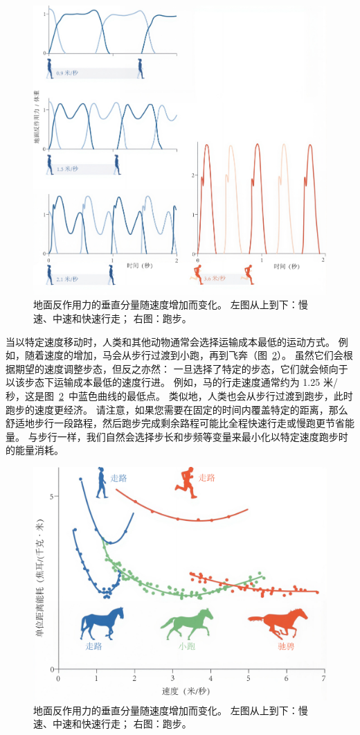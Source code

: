\begin{figure}[!htb]
	\centering
	\includegraphics[width=1.0\linewidth]{chap3/3_17}
	\caption{地面反作用力的垂直分量随速度增加而变化。
		左图从上到下：慢速、中速和快速行走；
		右图：跑步\cite{alexander1984walking}。 \label{fig:3_17}}
\end{figure}


当以特定速度移动时，人类和其他动物通常会选择运输成本最低的运动方式。
例如，随着速度的增加，马会从步行过渡到小跑，再到飞奔（图~\ref{fig:3_18}）。
虽然它们会根据期望的速度调整步态，但反之亦然：
一旦选择了特定的步态，它们就会倾向于以该步态下运输成本最低的速度行进。
例如，马的行走速度通常约为 1.25 米/秒，这是图~\ref{fig:3_18}~中蓝色曲线的最低点。
类似地，人类也会从步行过渡到跑步，此时跑步的速度更经济。
请注意，如果您需要在固定的时间内覆盖特定的距离，那么舒适地步行一段路程，然后跑步完成剩余路程可能比全程快速行走或慢跑更节省能量。
与步行一样，我们自然会选择步长和步频等变量来最小化以特定速度跑步时的能量消耗。

\begin{figure}[!htb]
	\centering
	\includegraphics[width=0.85\linewidth]{chap3/3_18}
	\caption{地面反作用力的垂直分量随速度增加而变化。
		左图从上到下：慢速、中速和快速行走；
		右图：跑步\cite{alexander1984walking}。 \label{fig:3_18}}
\end{figure}











